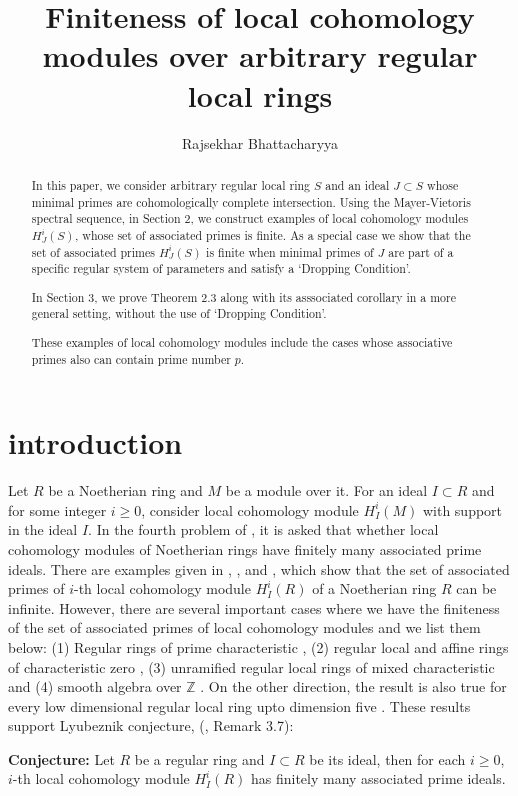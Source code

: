 \documentclass[10pt]{amsart}
\title[]{Finiteness of local cohomology modules over arbitrary regular local rings}
\author[]{Rajsekhar Bhattacharyya}
\theoremstyle{plain}
\theoremstyle{definition}
\newcommand{\ZZ}{{\mathbb Z}}
\begin{document}
\begin{abstract}
In this paper, we consider arbitrary regular local ring $S$ and an ideal $J\subset S$ whose minimal primes are cohomologically complete intersection. Using the Mayer-Vietoris spectral sequence, in Section 2, we construct examples of local cohomology modules $H^i_J (S)$, whose set of associated primes is finite. As a special case we show that the set of associated primes $H^i_J (S)$ is finite when minimal primes of $J$ are part of a specific regular system of parameters and satisfy a `Dropping Condition'. 

In Section 3, we prove Theorem 2.3 along with its asssociated corollary in a more general setting, without the use of `Dropping Condition'. 

These examples of local cohomology modules include the cases whose associative primes also can contain prime number $p$.
\end{abstract}

\maketitle
\section{introduction}

Let $R$ be a Noetherian ring and $M$ be a module over it. For an ideal $I\subset R$ and for some integer $i\geq 0$, consider local cohomology module $H^i_I (M)$ with support in the ideal $I$. In the fourth problem of \cite{Hu}, it is asked that whether local cohomology modules of Noetherian rings have finitely many associated prime ideals. There are examples given in \cite{Si}, \cite{Ka}, and \cite{SS}, which show that the set of associated primes of $i$-th local cohomology module $H^i_I (R)$ of a Noetherian ring $R$ can be infinite. However, there are several important cases where we have the finiteness of the set of associated primes of local cohomology modules and we list them below: (1) Regular rings of prime characteristic \cite{HS}, (2) regular local and affine rings of characteristic zero \cite{Ly1}, (3) unramified regular local rings of mixed characteristic \cite{Ly2} and (4) smooth algebra over $\ZZ$ \cite{BBLSZ}. On the other direction, the result is also true for every low dimensional regular local ring upto dimension five \cite{Boix}. These results support Lyubeznik conjecture, (\cite{Ly1}, Remark 3.7): 

\textbf{Conjecture:} Let $R$ be a regular ring and $I\subset R$ be its ideal, then for each $i\geq 0$, $i$-th local cohomology module $H^i_I (R)$ has finitely many associated prime ideals.
\end{document}
